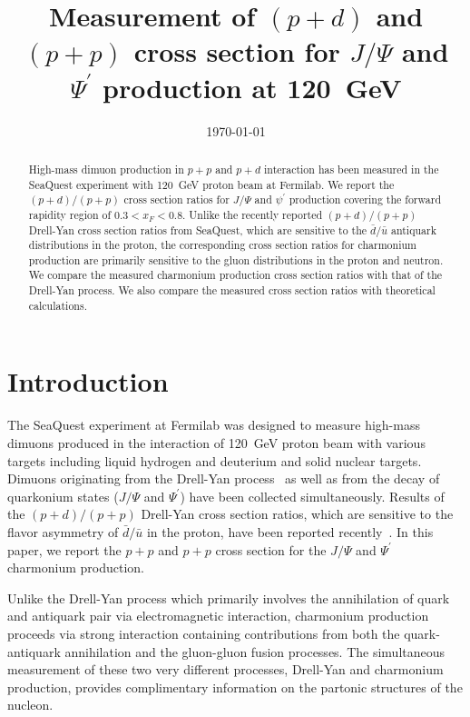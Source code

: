 \documentclass[reprint,aps,unsortedaddress,superscriptaddress,prd,floatfix,showpacs,linenumbers]{revtex4-2}
\begin{document}
\title{Measurement of $(p+d)$ and $(p+p)$ cross section for
	$J/\Psi$ and $\Psi^\prime$ production at \SI{120}{\GeV}}


\date{\today}
\begin{abstract}
	High-mass dimuon production in $p+p$ and $p+d$ interaction has been measured
	in the SeaQuest experiment with \SI{120}{\GeV} proton beam at Fermilab.
	We report the $(p+d) / (p+p)$ cross section
	ratios for $J/\Psi$ and $\psi^\prime$ production covering the forward
	rapidity region of $0.3 < x_F <0.8$. Unlike the recently reported
	$(p+d) / (p+p)$ Drell-Yan cross section ratios from SeaQuest, which are
	sensitive to the
	$\bar{d} / \bar{u}$ antiquark distributions in the proton, the corresponding
	cross section ratios for charmonium production are primarily
	sensitive to the gluon
	distributions in the proton and neutron. We compare the measured
	charmonium production cross section ratios with that of the
	Drell-Yan process. We also compare the measured cross section ratios with
	theoretical calculations.

\end{abstract}


\maketitle
\section{Introduction}
The SeaQuest experiment at Fermilab was designed to measure high-mass dimuons
produced in the interaction of \SI{120}{\GeV} proton beam with various targets
including liquid hydrogen and deuterium and solid nuclear targets. Dimuons
originating from the Drell-Yan process~\cite{drell1970} as well as from the decay of quarkonium
states ($J/\Psi$ and $\Psi^\prime$) have been collected simultaneously.
Results of the $(p+d) / (p+p)$ Drell-Yan cross section ratios, which are sensitive
to the flavor asymmetry of $\bar{d}/ \bar{u}$ in the proton, have been reported
recently~\cite{dove2021,dove2023}. In this paper, we report the
$p+p$ and $p+p$ cross section for the $J/\Psi$ and $\Psi^\prime$ charmonium production.

Unlike the Drell-Yan process which primarily involves the annihilation
of quark and antiquark pair via electromagnetic interaction, charmonium
production proceeds via strong interaction containing contributions from
both the quark-antiquark annihilation and the gluon-gluon
fusion processes. The simultaneous measurement of these two very different
processes, Drell-Yan and charmonium production, provides complimentary
information on the partonic structures of the nucleon.
\end{document}
